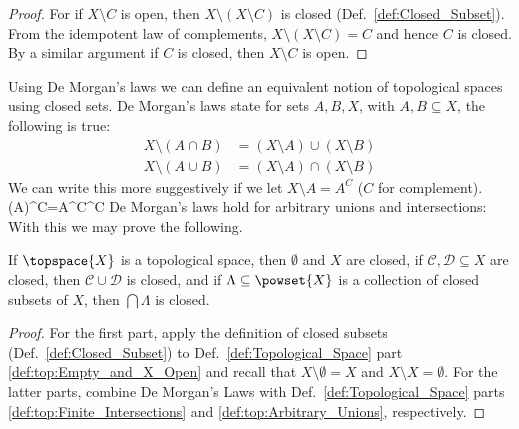 \documentclass{book}                                                           %
\begin{document}
                \begin{proof}
                    For if $X\setminus{C}$ is open, then
                    $X\setminus(X\setminus{C})$ is closed
                    (Def.~\ref{def:Closed_Subset}). From the idempotent law of
                    complements, $X\setminus(X\setminus{C})=C$ and hence $C$ is
                    closed. By a similar argument if $C$ is closed, then
                    $X\setminus{C}$ is open.
                \end{proof}
                Using De Morgan's laws we can define an equivalent notion of
                topological spaces using closed sets. De Morgan's laws state for
                sets $A,B,X$, with $A,B\subseteq{X}$, the following is true:%
                \begin{subequations}
                    \begin{align}
                        X\setminus(A\cap{B})
                            &=(X\setminus{A})\cup(X\setminus{B})\\
                        X\setminus(A\cup{B})
                            &=(X\setminus{A})\cap(X\setminus{B})
                    \end{align}
                \end{subequations}
                We can write this more suggestively if we let
                $X\setminus{A}=A^{C}$ ($C$ for complement).
                \vspace{-5ex}
                            {(A)^{C}=A^{C}^{C}}
                De Morgan's laws hold for arbitrary unions and intersections:
                With this we may prove the following.
                \begin{theorem}
                    If $\topspace{X}$ is a topological space, then $\emptyset$
                    and $X$ are closed, if $\mathcal{C},\mathcal{D}\subseteq{X}$
                    are closed, then $\mathcal{C}\cup\mathcal{D}$ is closed, and
                    if $\Lambda\subseteq\powset{X}$ is a collection of closed
                    subsets of $X$, then $\bigcap\Lambda$ is closed.
                \end{theorem}
                \begin{proof}
                    For the first part, apply the definition of closed subsets
                    (Def.~\ref{def:Closed_Subset}) to
                    Def.~\ref{def:Topological_Space} part
                    \ref{def:top:Empty_and_X_Open} and recall that
                    $X\setminus\emptyset=X$ and $X\setminus{X}=\emptyset$. For
                    the latter parts, combine De Morgan's Laws with
                    Def.~\ref{def:Topological_Space} parts
                    \ref{def:top:Finite_Intersections} and
                    \ref{def:top:Arbitrary_Unions}, respectively.
                \end{proof}
\end{document}
